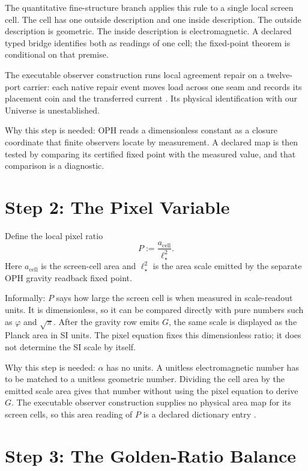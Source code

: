 \documentclass[11pt]{article}
\theoremstyle{remark}
\begin{document}
The quantitative fine-structure branch applies this rule to a single local
screen cell. The cell has one outside description and one inside description.
The outside description is geometric. The inside description is
electromagnetic. A declared typed bridge identifies both as readings of one
cell; the fixed-point theorem is conditional on that premise.

The executable observer construction runs local agreement repair on a twelve-port carrier:
each native repair event moves load across one seam and records its placement coin and the
transferred current \cite{ophmodel}. Its physical identification with our Universe is unestablished.

Why this step is needed: OPH reads a dimensionless constant as a closure coordinate that finite observers locate by measurement. A declared map is then tested by comparing its certified fixed point with the measured value, and that comparison is a diagnostic.

\section{Step 2: The Pixel Variable}

Define the local pixel ratio
\begin{equation}
P:=\frac{a_{\mathrm{cell}}}{\ell_\star^2}.
\label{eq:Pdef}
\end{equation}
Here \(a_{\mathrm{cell}}\) is the screen-cell area and \(\ell_\star^2\) is the area scale emitted
by the separate OPH gravity readback fixed point.

Informally: \(P\) says how large the screen cell is when measured in scale-readout units. It is dimensionless, so it can be compared directly with pure numbers such as \(\varphi\) and \(\sqrt\pi\). After the gravity row emits \(G\), the same scale is displayed as the Planck area in SI units. The pixel equation fixes this dimensionless ratio; it does not determine the SI scale by itself.

Why this step is needed: \(\alpha\) has no units. A unitless electromagnetic number has to be matched to a unitless geometric number. Dividing the cell area by the emitted scale area gives that number without using the pixel equation to derive \(G\).
The executable observer construction supplies no physical area map for its screen cells, so this
area reading of \(P\) is a declared dictionary entry \cite{ophconstruction}.

\section{Step 3: The Golden-Ratio Balance}
\end{document}
